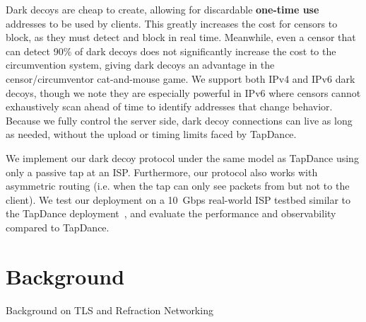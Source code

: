 \documentclass[letterpaper,twocolumn,10pt]{article}
\begin{document}
Dark decoys are cheap to create, allowing for discardable \textbf{one-time use}
addresses to be used by clients. This greatly increases the cost for censors to
block, as they must detect and block in real time. Meanwhile, even a censor that
can detect 90\% of dark decoys does not significantly increase the cost to the
circumvention system, giving dark decoys an advantage in the censor/circumventor
cat-and-mouse game.
We support both IPv4 and IPv6 dark decoys, though we note they are especially
powerful in IPv6 where censors cannot exhaustively scan ahead of time to
identify addresses that change behavior.
Because we fully control the server side, dark decoy connections can live as
long as needed, without the upload or timing limits faced by TapDance.





We implement our dark decoy protocol under the same model as TapDance using
only a passive tap at an ISP. Furthermore, our protocol also works with
asymmetric routing (i.e. when the tap can only see packets from but not to the
client). We test our deployment on a 10~Gbps real-world ISP testbed similar to the
TapDance deployment~\cite{frolov2017isp}, and evaluate the performance and
observability compared to TapDance.





\section{Background}
Background on TLS and Refraction Networking
\end{document}
